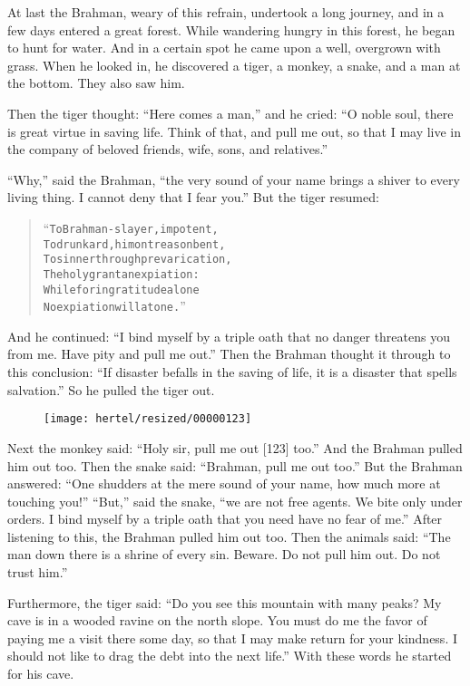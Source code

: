 \documentclass[article, twoside, 10pt]{memoir}
\renewenvironment{verbatim}{%
\begin{quote}%
\vskip -10pt%
\begin{alltt}\normalfont\small}{\end{alltt}%
\end{quote}%
\vskip -10pt
} %
\begin{document}
At last the Brahman, weary of this refrain, undertook a long
journey, and in a few days entered a great forest. While wandering
hungry in this forest, he began to hunt for water. And in a certain
spot he came upon a well, overgrown with grass. When he looked in,
he discovered a tiger, a monkey, a snake, and a man at the bottom.
They also saw him.

Then the tiger thought: ``Here comes a man,'' and he cried:
``O noble soul, there is great virtue in saving life. Think of that, and pull me out, so that I may live in the company of beloved friends, wife, sons, and relatives.''

``Why,'' said the Brahman,
``the very sound of your name brings a shiver to every living thing. I cannot deny that I fear you.''
But the tiger resumed:

\begin{verbatim}
“To Brahman-slayer, impotent,
To drunkard, him on treason bent,
To sinner through prevarication,
The holy grant an expiation:
While for ingratitude alone
No expiation will atone.”
\end{verbatim}
And he continued:
``I bind myself by a triple oath that no danger threatens you from me. Have pity and pull me out.''
Then the Brahman thought it through to this conclusion:
``If disaster befalls in the saving of life, it is a disaster that spells salvation.''
So he pulled the tiger out.

\begin{figure}[p]\texttt{[image: hertel/resized/00000123]}\end{figure}Next the monkey said: ``Holy sir, pull me out [123] too.'' And the
Brahman pulled him out too. Then the snake said:
``Brahman, pull me out too.'' But the Brahman answered:
``One shudders at the mere sound of your name, how much more at touching you!''
``But,'' said the snake,
``we are not free agents. We bite only under orders. I bind myself by a triple oath that you need have no fear of me.''
After listening to this, the Brahman pulled him out too. Then the
animals said:
``The man down there is a shrine of every sin. Beware. Do not pull him out. Do not trust him.''

Furthermore, the tiger said:
``Do you see this mountain with many peaks? My cave is in a wooded ravine on the north slope. You must do me the favor of paying me a visit there some day, so that I may make return for your kindness. I should not like to drag the debt into the next life.''
With these words he started for his cave.
\end{document}
